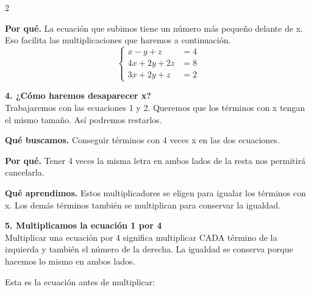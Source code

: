\documentclass[11pt,a4paper,landscape]{article}
\begin{document}
\begin{multicols*}{2}
\begin{minipage}{\linewidth}
\par\smallskip\textbf{Por qué.} La ecuación que subimos tiene un número más pequeño delante de x. Eso facilita las multiplicaciones que haremos a continuación.
\[\left\{\begin{aligned}x - y + z &= 4\\4x + 2y + 2z &= 8\\3x + 2y + z &= 2\end{aligned}\right.\]
\end{minipage}\par\medskip
\noindent\begin{minipage}{\linewidth}\textbf{4. ¿Cómo haremos desaparecer x?}\\[2pt]Trabajaremos con las ecuaciones 1 y 2. Queremos que los términos con x tengan el mismo tamaño. Así podremos restarlos.
\par\smallskip\textbf{Qué buscamos.} Conseguir términos con 4 veces x en las dos ecuaciones.
\par\smallskip\textbf{Por qué.} Tener 4 veces la misma letra en ambos lados de la resta nos permitirá cancelarla.
\par{}\par\smallskip
\par\smallskip\textbf{Qué aprendimos.} Estos multiplicadores se eligen para igualar los términos con x. Los demás términos también se multiplican para conservar la igualdad.
\end{minipage}\par\medskip
\noindent\begin{minipage}{\linewidth}\textbf{5. Multiplicamos la ecuación 1 por 4}\\[2pt]Multiplicar una ecuación por 4 significa multiplicar CADA término de la izquierda y también el número de la derecha. La igualdad se conserva porque hacemos lo mismo en ambos lados.
\par\smallskip Esta es la ecuación antes de multiplicar:

\end{minipage}
\end{multicols*}
\end{document}
